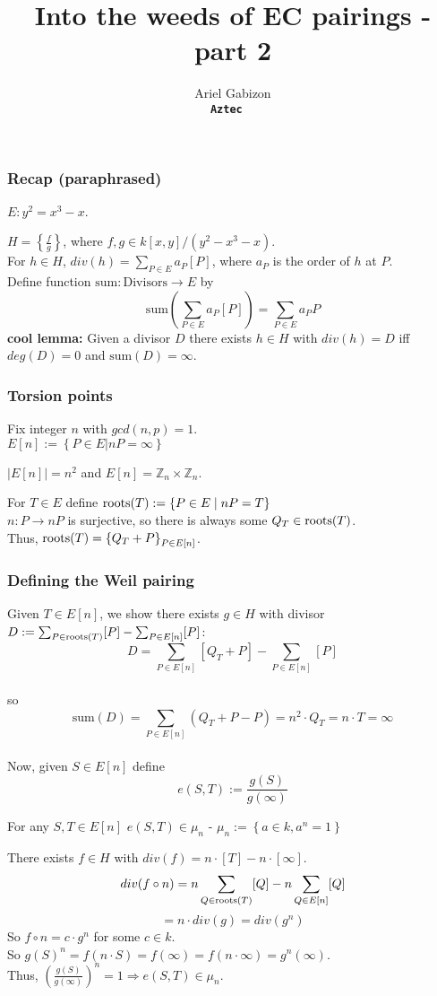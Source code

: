 \documentclass[shadesubsections,compress,14pt,mathserif]{beamer}
\title{\large{Into the weeds of EC pairings - part 2}}    %
\author{\small{Ariel Gabizon}\\                 %
\tt{\footnotesize{\textbf{Aztec} }}  }
\newcommand{\set}[1]{\ensuremath{\left\{#1\right\}}}
\newcommand{\defeq}{\ensuremath{:=}}
\newcommand{\nl}{\\ \pause \vspace{0.2in}}
\newcommand{\roots}{\ensuremath\textrm{roots}}
\begin{document}
\boldmath
\begin{frame}
  \titlepage
\end{frame}



\begin{frame}
\frametitle{Recap (paraphrased)}   %
$E: y^2=x^3-x$.  

$H=\set{\frac{f}{g}}$, where $f,g\in k[x,y]/(y^2-x^3-x)$. \\ \pause
\vspace{0.2in}
For $h\in H$,
$div(h)=\sum_{P\in E} a_P[P]$,
where $a_P$ is the order of $h$ at $P$.\\ \pause
Define function $\mathrm{sum}:\mathrm{Divisors}\to E$ by
$$\mathrm{sum}\left(\sum_{P\in E} a_P[P]\right) = \sum_{P\in E} a_P P$$\pause
\textbf{cool lemma:} Given a divisor $D$ there exists $h\in H$ with $div(h)=D$ iff
$deg(D)=0$ and $\mathrm{sum}(D)=\infty$.

\end{frame}
\begin{frame}
\frametitle{Torsion points}
Fix integer $n$ with $gcd(n,p)=1$.\\
$E[n]\defeq \set{P\in E|n P = \infty}$ \nl
\begin{theorem}
 $|E[n]|=n^2$ and $E[n]=\mathbb{Z}_n\times \mathbb{Z}_n$.\nl
 \end{theorem}
For $T\in E$ define $\roots(T)\defeq \set{P\in E\;| \;n P = T}$ \nl
$n:P\to n P$ is surjective, so  there is always some $Q_T\in \roots(T)$. \nl
Thus, $\roots(T)=\set{Q_T+P}_{P\in E[n]}$.

\end{frame}
\begin{frame}
\frametitle{Defining the Weil pairing}
\pause
Given $T\in E[n]$, we show there exists $g\in H$ with divisor
$D\defeq \sum_{P\in \roots(T)} [P] - \sum_{P\in E[n]} [P]$:\nl
$$D= \sum_{P\in E[n]} [Q_T+P] - \sum_{P\in E[n]} [P]$$\\ \pause
so $$\mathrm{sum}(D) =\sum_{P\in E[n]}(Q_T+P-P) = n^2\cdot Q_T = n\cdot T = \infty$$\\ \pause 
Now, given $S\in E[n]$ define
$$e(S,T)\defeq \frac{g(S)}{g(\infty)}$$


\end{frame}
\begin{frame}
 \begin{lemma} For any $S,T\in E[n]$ $e(S,T)\in \mu_n$ -  $\scriptstyle{\mu_n \defeq \set{a\in k, a^n=1}}$
 \end{lemma}
 There exists $f\in H$ with $div(f) = n\cdot [T] - n\cdot[\infty]$.\\ \pause
 $$div(f\circ n) = n\sum_{Q\in \roots(T)} [Q] - n \sum_{Q\in E[n]} [Q]$$
 $$= n\cdot div(g)= div(g^n)$$\pause
 So $f\circ n = c\cdot g^n$ for some $c\in k$.\nl
 So
    $g(S)^n = f(n\cdot S) = f(\infty) = f(n\cdot \infty) = g^n(\infty)$.\\ \pause
    Thus, $\left(\frac{g(S)}{g(\infty)}\right)^n =1 \Rightarrow e(S,T)\in \mu_n$.
 \end{frame}
\end{document}
